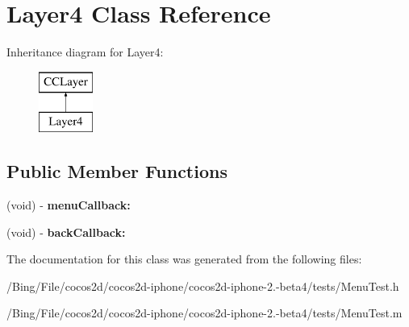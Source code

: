 \hypertarget{interface_layer4}{\section{Layer4 Class Reference}
\label{interface_layer4}
}
Inheritance diagram for Layer4\-:\begin{figure}[H]
\begin{center}
\leavevmode
\includegraphics[height=2.000000cm]{interface_layer4}
\end{center}
\end{figure}
\subsection*{Public Member Functions}
\begin{DoxyCompactItemize}
\item 
\hypertarget{interface_layer4_a9af4b319219b478bb9094fd7497e151d}{(void) -\/ {\bfseries menu\-Callback\-:}}\label{interface_layer4_a9af4b319219b478bb9094fd7497e151d}

\item 
\hypertarget{interface_layer4_aa0709933bc891cfe658eec0fca6d9669}{(void) -\/ {\bfseries back\-Callback\-:}}\label{interface_layer4_aa0709933bc891cfe658eec0fca6d9669}

\end{DoxyCompactItemize}


The documentation for this class was generated from the following files\-:\begin{DoxyCompactItemize}
\item 
/\-Bing/\-File/cocos2d/cocos2d-\/iphone/cocos2d-\/iphone-\/2.-\/beta4/tests/Menu\-Test.\-h\item 
/\-Bing/\-File/cocos2d/cocos2d-\/iphone/cocos2d-\/iphone-\/2.-\/beta4/tests/Menu\-Test.\-m\end{DoxyCompactItemize}
